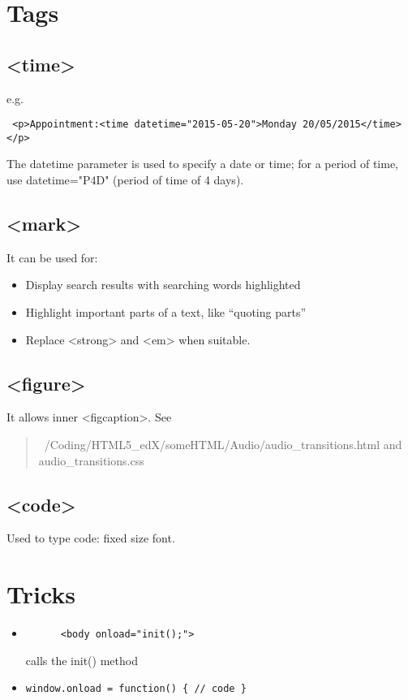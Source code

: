 \documentclass[a4paper,11pt]{book}
\begin{document}
\chapter{Tags}
    \section{<time>}
    e.g.
    \begin{verbatim} <p>Appointment:<time datetime="2015-05-20">Monday 20/05/2015</time></p> \end{verbatim}
    The datetime parameter is used to specify a date or time; for a period of time, use datetime="P4D"
    (period of time of 4 days).
    \section{<mark>}
    It can be used for:
    \begin{itemize}
        \item Display search results with searching words highlighted
        \item Highlight important parts of a text, like ``quoting parts''
        \item Replace <strong> and <em> when suitable.
    \end{itemize}

    \section{<figure>}
    It allows inner <figcaption>. See
    \begin{verse}
~/Coding/HTML5\_edX/someHTML/Audio/audio\_transitions.html and audio\_transitions.css
	\end{verse}

	\section{<code>}
	Used to type code: fixed size font.

\chapter{Tricks}
\begin{itemize}
\item \begin{verbatim}
	  <body onload="init();">
	  \end{verbatim}	
	  calls the init() method
\item \texttt{window.onload = function() \{ // code \}}
\end{itemize}
\end{document}
